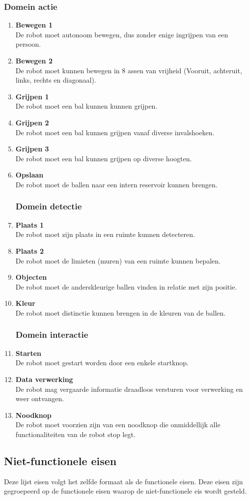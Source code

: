 \documentclass[12pt]{article} %
\begin{document}
\subsubsection*{Domein actie}
\newcommand\litem[1]{\item{\bfseries #1\\}}
\begin{enumerate}
\litem{Bewegen 1} De robot moet autonoom bewegen, dus zonder enige ingrijpen van een persoon.
\litem{Bewegen 2} De robot moet kunnen bewegen in 8 assen van vrijheid (Vooruit, achteruit, links, rechts en diagonaal).
\litem{Grijpen 1} De robot moet een bal kunnen kunnen grijpen.
\litem{Grijpen 2} De robot moet een bal kunnen grijpen vanaf diverse invalshoeken.
\litem{Grijpen 3} De robot moet een bal kunnen grijpen op diverse hoogten.
\litem{Opslaan} De robot moet de ballen naar een intern reservoir kunnen brengen.
\newpage
\subsubsection*{Domein detectie}
\litem{Plaats 1} De robot moet zijn plaats in een ruimte kunnen detecteren.
\litem{Plaats 2} De robot moet de limieten (muren) van een ruimte kunnen bepalen.
\litem{Objecten} De robot moet de anderskleurige ballen vinden in relatie met zijn positie.
\litem{Kleur} De robot moet distinctie kunnen brengen in de kleuren van de ballen. 
\subsubsection*{Domein interactie}
\litem{Starten} De robot moet gestart worden door een enkele startknop.
\litem{Data verwerking} De robot mag vergaarde informatie draadloos versturen voor verwerking en weer ontvangen.
\litem{Noodknop} De robot moet voorzien zijn van een noodknop die onmiddellijk alle functionaliteiten van de robot stop legt.
\end{enumerate}
\newpage
\subsection{Niet-functionele eisen}
Deze lijst eisen volgt het zelfde formaat als de functionele eisen. Deze eisen zijn gegroepeerd op de functionele eisen waarop de niet-functionele eis wordt gesteld.
\end{document}
